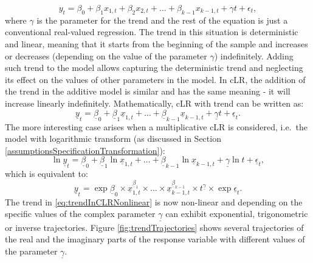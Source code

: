 \documentclass[
]{book}
\begin{document}
\begin{equation}
    {y}_t = {\beta}_0 + {\beta}_1 {x}_{1,t} + {\beta}_2 {x}_{2,t} + \dots + {\beta}_{k-1} {x}_{k-1,t} + \gamma t + {\epsilon}_t,
    \label{eq:trendInRealModel}
\end{equation}
where \(\gamma\) is the parameter for the trend and the rest of the equation is just a conventional real-valued regression. The trend in this situation is deterministic and linear, meaning that it starts from the beginning of the sample and increases or decreases (depending on the value of the parameter \(\gamma\)) indefinitely. Adding such trend to the model allows capturing the deterministic trend and neglecting its effect on the values of other parameters in the model. In cLR, the addition of the trend in the additive model is similar and has the same meaning - it will increase linearly indefinitely. Mathematically, cLR with trend can be written as:
\begin{equation}
    \underline{y}_t = \underline{\beta}_0 + \underline{\beta}_1 \underline{x}_{1,t} + \dots + \underline{\beta}_{k-1} \underline{x}_{k-1,t} + \underline{\gamma} t + \underline{\epsilon}_t .
    \label{eq:trendInCLR}
\end{equation}
The more interesting case arises when a multiplicative cLR is considered, i.e.~the model with logarithmic transform (as discussed in Section \ref{assumptionsSpecificationTransformation}):
\begin{equation}
    \ln \underline{y}_t = \underline{\beta}_0 + \underline{\beta}_1 \ln \underline{x}_{1,t} + \dots + \underline{\beta}_{k-1} \ln \underline{x}_{k-1,t} + \underline{\gamma} \ln t + \underline{\epsilon}_t ,
    \label{eq:trendInCLRLogs}
\end{equation}
which is equivalent to:
\begin{equation}
    \underline{y}_t = \exp \underline{\beta}_0 \times \underline{x}_{1,t}^{\underline{\beta}_1} \times \dots \times \underline{x}_{k-1,t}^{\underline{\beta}_{k-1}} \times t^{\underline{\gamma}} \times \exp \underline{\epsilon}_t .
    \label{eq:trendInCLRNonlinear}
\end{equation}
The trend in \eqref{eq:trendInCLRNonlinear} is now non-linear and depending on the specific values of the complex parameter \(\underline{\gamma}\) can exhibit exponential, trigonometric or inverse trajectories. Figure \ref{fig:trendTrajectories} shows several trajectories of the real and the imaginary parts of the response variable with different values of the parameter \(\underline{\gamma}\).
\end{document}

